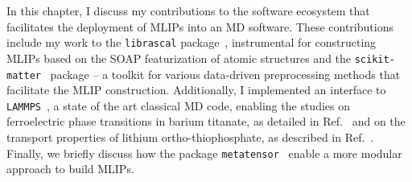 In this chapter, I discuss my contributions to the software ecosystem that facilitates the deployment of MLIPs into an MD software.
These contributions include my work to the \texttt{librascal} package~\cite{LIBRASCAL}, instrumental for constructing MLIPs based on the SOAP featurization of atomic structures and the \texttt{scikit-matter}~\cite{goscinski2023scikit} package -- a toolkit for various data-driven preprocessing methods that facilitate the MLIP construction. %
Additionally, I implemented an interface to \texttt{LAMMPS}~\cite{LAMMPS}, a state of the art classical MD code, enabling the studies on ferroelectric phase transitions in barium titanate, as detailed in Ref.~\cite{gigli2023modeling} and on the transport properties of lithium ortho-thiophosphate, as described in Ref.~\cite{gigli2023mechanism}.
Finally, we briefly discuss how the package \texttt{metatensor}~\cite{metatensor} enable a more modular approach to build MLIPs.

